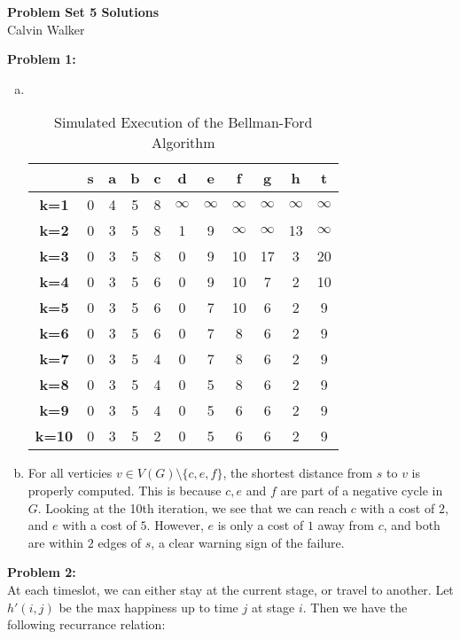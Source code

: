 \documentclass{article}
\begin{document}
\begin{center}
    \Large{\textbf{Problem Set 5 Solutions}} \\[0.25ex]
    Calvin Walker
\end{center}
\textbf{Problem 1:} 
\begin{enumerate}[a)]
    \item \textcolor{white}{{x}}
    \begin{table}[htbp]
    \centering
    \begin{tabular}{|c|c|c|c|c|c|c|c|c|c|c|}  
    \hline
    & \textbf{s} & \textbf{a} & \textbf{b} & \textbf{c} & \textbf{d} & \textbf{e} & \textbf{f} & \textbf{g} & \textbf{h} & \textbf{t}\\
    \hline
    \textbf{k=1} &0 &4 &5 &8 & $\infty$ & $\infty$ & $\infty$ & $\infty$ & $\infty$ & $\infty$\\
    \hline
    \textbf{k=2} &0 &3 &5 &8 &1 &9 &$\infty$ &$\infty$ &13 &$\infty$ \\
    \hline
    \textbf{k=3} &0 &3 &5 &8 &0 &9 &10 &17 &3 &20\\
    \hline
    \textbf{k=4} &0 &3 &5 &6 &0 &9 &10 &7 &2 &10\\
    \hline
    \textbf{k=5} &0 &3 &5 &6 &0 &7 &10 &6 &2 &9 \\
    \hline
    \textbf{k=6} &0 &3 &5 &6 &0 &7 &8 &6 &2 &9 \\
    \hline
    \textbf{k=7} &0 &3 &5 &4 &0 &7 &8 &6 &2 &9\\
    \hline
    \textbf{k=8} &0 &3 &5 &4 &0 &5 &8 &6 &2 &9 \\
    \hline
    \textbf{k=9} &0 &3 &5 &4 &0 &5 &6 &6 &2 &9 \\
    \hline
    \textbf{k=10} &0 &3 &5 &2 &0 &5 &6 &6 &2 &9 \\
    \hline
    \end{tabular}
    \caption{Simulated Execution of the Bellman-Ford Algorithm}
    \end{table}
    \item For all verticies $v \in V(G) \setminus \{c, e, f\}$, the shortest distance from $s$ to $v$ is properly computed. This is because $c, e$ and $f$ are part of a negative cycle in $G$. Looking at the 10th iteration, we see that we can reach $c$ with a cost of $2$, and $e$ with a cost of $5$. However, $e$ is only a cost of $1$ away from $c$, and both are within $2$ edges of $s$, a clear warning sign of the failure. 
\end{enumerate}
\textbf{Problem 2:} \\[0.75ex]
At each timeslot, we can either stay at the current stage, or travel to another. Let $h'(i, j)$ be the max happiness up to time $j$ at stage $i$. Then we have the following recurrance relation: 
\end{document}
